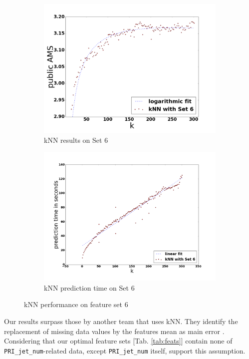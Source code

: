 \begin{figure}
	\centering
	\begin{subfigure}[b]{0.45\textwidth}
		\includegraphics[width=\textwidth]{images/knn_ams}
        \caption{kNN results on Set 6}
        \label{fig:knnams}
	\end{subfigure}
	\qquad
	\begin{subfigure}[b]{0.45\textwidth}
		\includegraphics[width=\textwidth]{images/knn_speed}
        \caption{kNN prediction time on Set 6}
        \label{fig:knnspeed}
	\end{subfigure}
	\caption{kNN performance on feature set 6}
	\label{fig:knn_perf}
\end{figure}

Our results surpass those by another team that uses kNN. They identify the replacement of missing data values by the features mean as main error \cite{california}. Considering that our optimal feature sets [Tab. \ref{tab:feats}] contain none of \texttt{PRI\_jet\_num}-related data, except \texttt{PRI\_jet\_num} itself, support this assumption.